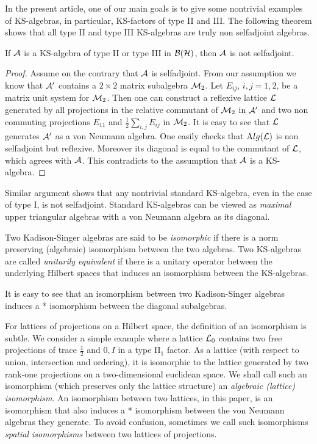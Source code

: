 In the present article, one of our main goals is to give some
nontrivial examples of KS-algebras, in particular, KS-factors of
type II and III. The following theorem shows that all type II and
type III KS-algebras are truly non selfadjoint algebras.

\begin{theorem}
If $\mathcal A$ is a KS-algebra of type II or type III in $\mathcal B(\mathcal H)$, then $\mathcal A$ is not
selfadjoint.
\end{theorem}

\begin{proof}
Assume on the contrary that $\mathcal A$ is
selfadjoint. From our assumption we know that $\mathcal A'$ contains a
$2\times 2$ matrix subalgebra $\mathcal M_2$. Let $E_{ij}$, $i,j=1,2$, be
a matrix unit system for $\mathcal M_2$. Then one can construct a
reflexive lattice $\mathcal L$ generated by all projections in the
relative commutant of $\mathcal M_2$ in $\mathcal A'$ and two non commuting
projections $E_{11}$ and $\frac12\sum_{i,j}E_{ij}$ in $\mathcal M_2$. It
is easy to see that $\mathcal L$ generates $\mathcal A'$ as a von Neumann algebra.
One easily checks that $\mathrm Alg(\mathcal L)$ is non selfadjoint but
reflexive. Moreover its diagonal is equal to the commutant of
$\mathcal L$, which agrees with $\mathcal A$. This contradicts to the assumption
that $\mathcal A$ is a KS-algebra.
\end{proof}

\vskip6pt

Similar argument shows that any nontrivial standard KS-algebra,
even in the case of type I, is not selfadjoint. Standard
KS-algebras can be viewed as {\it maximal} upper triangular
algebras with a von Neumann algebra as its diagonal. \vskip6pt

\begin{definition}
Two Kadison-Singer
algebras are said to be {\sl isomorphic} if there is a norm
preserving (algebraic) isomorphism between the two algebras. Two
KS-algebras are called {\it unitarily equivalent} if there is a
unitary operator between the underlying Hilbert spaces that
induces an isomorphism between the KS-algebras. 
\end{definition}

It is easy to see that an isomorphism between two Kadison-Singer
algebras induces a * isomorphism between the diagonal subalgebras.

For lattices of projections on a Hilbert space, the definition of
an isomorphism is subtle. We consider a simple example where a
lattice $\mathcal L_0$ contains two free projections of trace $\frac12$
and $0, I$ in a type II$_1$ factor. As a lattice (with respect to
union, intersection and ordering), it is isomorphic to the lattice
generated by two rank-one projections on a two-dimensional
euclidean space. We shall call such an isomorphism (which
preserves only the lattice structure) an {\it algebraic (lattice)
isomorphism}. An isomorphism between two lattices, in this paper,
is an isomorphism that also induces a
* isomorphism between the von Neumann algebras they generate. To
avoid confusion, sometimes we call such isomorphisms {\it spatial
isomorphisms} between two lattices of projections.